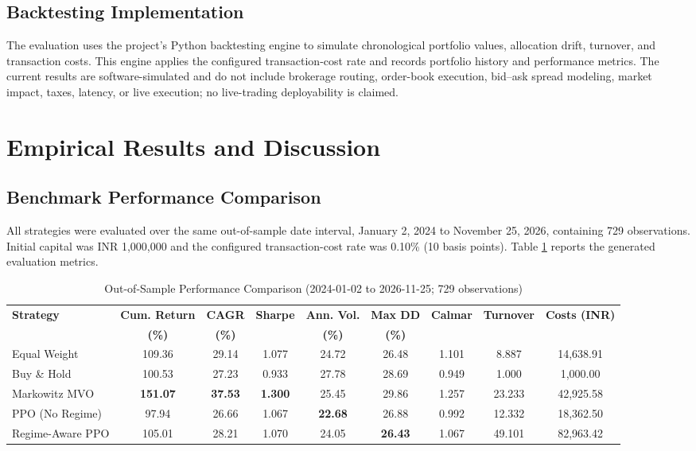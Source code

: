 \documentclass[conference]{IEEEtran}
\begin{document}
\subsection{Backtesting Implementation}
The evaluation uses the project's Python backtesting engine to simulate chronological portfolio values, allocation drift, turnover, and transaction costs. This engine applies the configured transaction-cost rate and records portfolio history and performance metrics. The current results are software-simulated and do not include brokerage routing, order-book execution, bid--ask spread modeling, market impact, taxes, latency, or live execution; no live-trading deployability is claimed.

\section{Empirical Results and Discussion}

\subsection{Benchmark Performance Comparison}
All strategies were evaluated over the same out-of-sample date interval, January 2, 2024 to November 25, 2026, containing 729 observations. Initial capital was INR 1,000,000 and the configured transaction-cost rate was 0.10\% (10 basis points). Table \ref{tab:results} reports the generated evaluation metrics.

\begin{table}[t]
\caption{Out-of-Sample Performance Comparison (2024-01-02 to 2026-11-25; 729 observations)}
\label{tab:results}
\centering
\begin{tabular}{lcccccccc}
\toprule
\textbf{Strategy} & \textbf{Cum. Return} & \textbf{CAGR} & \textbf{Sharpe} & \textbf{Ann. Vol.} & \textbf{Max DD} & \textbf{Calmar} & \textbf{Turnover} & \textbf{Costs (INR)} \\
 & \textbf{(\%)} & \textbf{(\%)} & & \textbf{(\%)} & \textbf{(\%)} & & & \\
\midrule
Equal Weight & 109.36 & 29.14 & 1.077 & 24.72 & 26.48 & 1.101 & 8.887 & 14,638.91 \\
Buy \& Hold & 100.53 & 27.23 & 0.933 & 27.78 & 28.69 & 0.949 & 1.000 & 1,000.00 \\
Markowitz MVO & \textbf{151.07} & \textbf{37.53} & \textbf{1.300} & 25.45 & 29.86 & 1.257 & 23.233 & 42,925.58 \\
PPO (No Regime) & 97.94 & 26.66 & 1.067 & \textbf{22.68} & 26.88 & 0.992 & 12.332 & 18,362.50 \\
Regime-Aware PPO & 105.01 & 28.21 & 1.070 & 24.05 & \textbf{26.43} & 1.067 & 49.101 & 82,963.42 \\
\bottomrule
\end{tabular}
\end{table}
\end{document}
